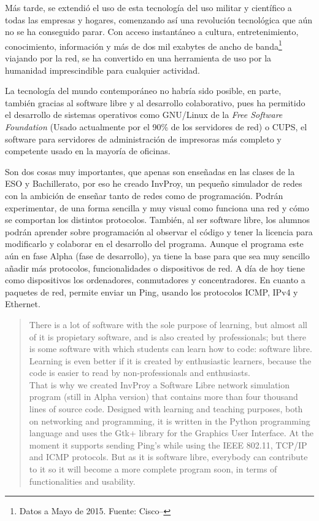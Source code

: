\documentclass[a4paper, 11pt]{report} %
\begin{document}
Más tarde, se extendió el uso de esta tecnología del uso militar y científico a todas las empresas y hogares, comenzando así una revolución tecnológica que aún no se ha conseguido parar. Con acceso instantáneo a cultura, entretenimiento, conocimiento, información y más de dos mil exabytes de ancho de banda\footnote{Datos a Mayo de 2015. Fuente: Cisco--\cite{Cisco}} viajando por la red, se ha convertido en una herramienta de uso por la humanidad imprescindible para cualquier actividad.

La tecnología del mundo contemporáneo no habría sido posible, en parte, también gracias al software libre y al desarrollo colaborativo, pues ha permitido el desarrollo de sistemas operativos como GNU/Linux de la \textit{Free Software Foundation} (Usado actualmente por el 90\% de los servidores de red) o CUPS, el software para servidores de administración de impresoras más completo y competente usado en la mayoría de oficinas.

Son dos cosas muy importantes, que apenas son enseñadas en las clases de la ESO y Bachillerato, por eso he creado InvProy, un pequeño simulador de redes con la ambición de enseñar tanto de redes como de programación. Podrán experimentar, de una forma sencilla y muy visual como funciona una red y cómo se comportan los distintos protocolos. También, al ser software libre, los alumnos podrán aprender sobre programación al observar el código y tener la licencia para modificarlo y colaborar en el desarrollo del programa. Aunque el programa este aún en fase Alpha (fase de desarrollo), ya tiene la base para que sea muy sencillo añadir más protocolos, funcionalidades o dispositivos de red. A día de hoy tiene como dispositivos los ordenadores, conmutadores y concentradores. En cuanto a paquetes de red, permite enviar un Ping, usando los protocolos ICMP, IPv4 y Ethernet. 

\newpage
\renewcommand{\abstractname}{\color{sectioncolour}Abstract}
\begin{abstract}
\setcounter{page}{5}
There is a lot of software with the sole purpose of learning, but almost all of it is propietary software, and is also created by professionals; but there is some software with which students can learn how to code: software libre. Learning is even better if it is created by enthusiastic learners, because the code is easier to read by non-professionals and enthusiasts. \\
That is why we created InvProy a Software Libre network simulation program (still in Alpha version) that contains more than four thousand lines of source code. Designed with learning and teaching purposes, both on networking and programming, it is written in the Python programming language and uses the Gtk+ library for the Graphics User Interface. At the moment it supports sending Ping’s while using the IEEE 802.11, TCP/IP and ICMP protocols. But as it is software libre, everybody can contribute to it so it will become a more complete program soon, in terms of functionalities and usability.
\end{abstract}
\restoregeometry
\end{document}
